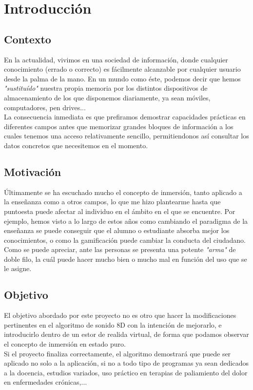 \section{Introducción}

\subsection{Contexto}
\justify 
\quad En la actualidad, vivimos en una sociedad de información, donde cualquier conocimiento (errado o correcto) es fácilmente alcanzable por cualquier usuario desde la palma de la mano. En un mundo como éste, podemos decir que hemos \textit{"sustituído"} nuestra propia memoria por los distintos dispositivos de almacenamiento de los que disponemos diariamente, ya sean móviles, computadores, pen drives...\\

\quad La consecuencia inmediata es que prefiramos demostrar capacidades prácticas en diferentes campos antes que memorizar grandes bloques de información a los cuales tenemos una acceso relativamente sencillo, permitiendonos así consultar los datos concretos que necesitemos en el momento.\\

\subsection{Motivación}
\quad Últimamente se ha escuchado mucho el concepto de inmersión, tanto aplicado a la enseñanza como a otros campos, lo que me hizo plantearme hasta que puntoesta puede afectar al individuo en el ámbito en el que se encuentre. Por ejemplo, hemos visto a lo largo de estos años como cambiando el paradigma de la enseñanza se puede conseguir que el alumno o estudiante absorba mejor los conocimientos, o como la gamificación puede cambiar la conducta del ciudadano.\\

\quad Como se puede apreciar, ante las personas se presenta una potente \textit{"arma"} de doble filo, la cuál puede hacer mucho bien o mucho mal en función del uso que se le asigne.\\


\subsection{Objetivo}
\quad El objetivo abordado por este proyecto no es otro que hacer la modificaciones pertinentes en el algoritmo de sonido 8D con la intención de mejorarlo, e introducirlo dentro de un estor de realida virtual, de forma que podamos observar el concepto de inmersión en estado puro.\\ 

\quad Si el proyecto finaliza correctamente, el algoritmo demostrará que puede ser aplicado no solo a la aplicación, si no a todo tipo de programas ya sean dedicados a la docencia, estudios variados, uso práctico en terapias de paliamiento del dolor en enfermedades crónicas,...\\

\newpage



